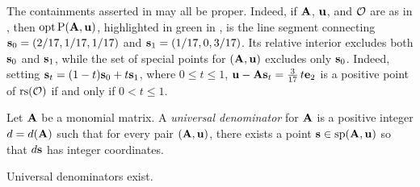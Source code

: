 \documentclass{article}
\begin{document}
\begin{example}
   \label{ex: ft.1}
   The containments asserted in  may all be proper.
   Indeed, if $\mathbf{A}$, $\mathbf{u}$, and $\mathcal{O}$ are as in , then $\operatorname{opt} \mathrm{P}(\mathbf{A},\mathbf{u})$, highlighted in green in , is the line segment connecting $\mathbf{s}_0 = (2/17, 1/17, 1/17)$ and $\mathbf{s}_1 = (1/17, 0, 3/17)$.
   Its relative interior excludes both $\mathbf{s}_0$ and $\mathbf{s}_1$, while the set of special points for $(\mathbf{A},\mathbf{u})$ excludes only $\mathbf{s}_0$.
   Indeed, setting $\mathbf{s}_t=(1-t)\mathbf{s}_0 + t \mathbf{s}_1$, where $0\le t\le 1$, $\mathbf{u} - \mathbf{A}\mathbf{s}_t = \frac{3}{17}\,t \mathbf{e}_2$ is a positive point of $\operatorname{rs}(\mathcal{O})$ if and only if $0<t\le 1$.
\end{example}


\begin{definition}
   \label{universal denominator: D}
   Let $\mathbf{A}$ be a monomial matrix.
   A \emph{universal denominator} for $\mathbf{A}$ is a positive integer $d = d(\mathbf{A})$ such that for every pair $(\mathbf{A}, \mathbf{u})$, there exists a point $\mathbf{s} \in \operatorname{sp}(\mathbf{A}, \mathbf{u})$ so that $d \mathbf{s}$ has integer coordinates.
\end{definition}

\begin{theorem}
   \label{universal-denominators-exist:  T}
   Universal denominators exist.
\end{theorem}
\end{document}
